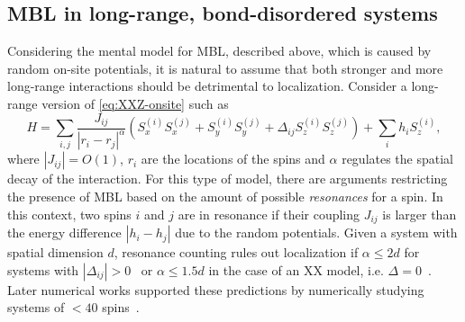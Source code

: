 %


\subsection{MBL in long-range, bond-disordered systems}
Considering the mental model for MBL, described above, which is caused by random on-site potentials, it is natural to assume that both stronger and more long-range interactions should be detrimental to localization. Consider a long-range version of \autoref{eq:XXZ-onsite} such as
\begin{equation}\label{eq:long-range-on-site-XXZ}
	H = \sum_{i,j} \frac{J_{ij}}{|r_i-r_j|^\alpha} \left(S_x^{(i)}S_x^{(j)} + S_y^{(i)}S_y^{(j)} + \Delta_{ij} S_z^{(i)}S_z^{(j)}\right) + \sum_i h_i S_z^{(i)},
\end{equation}
where $|J_{ij}|=O(1)$, $r_i$ are the locations of the spins and $\alpha$ regulates the spatial decay of the interaction.
For this type of model, there are arguments restricting the presence of MBL based on the amount of possible \emph{resonances} for a spin. In this context, two spins $i$ and $j$ are in resonance if their coupling $J_{ij}$ is larger than the energy difference $|h_i-h_j|$ due to the random potentials.
Given a system with spatial dimension $d$, resonance counting rules out localization if $\alpha \leq 2d$ for systems with $|\Delta_{ij}| >0$~\cite{burinEnergyDelocalizationStrongly2006,yaoManyBodyLocalizationDipolar2014,burinManybodyDelocalizationStrongly2015,gutmanEnergyTransportAnderson2016} or $\alpha \leq 1.5d$ in the case of an XX model, i.e. $\Delta=0$~\cite{burinLocalizationRandomXY2015}. Later numerical works supported these predictions by numerically studying systems of $< 40$ spins~\cite{schifferManybodyLocalizationSpin2019,safavi-nainiQuantumDynamicsDisordered2019,yousefjaniMobilityEdgeLongrange2023}.


